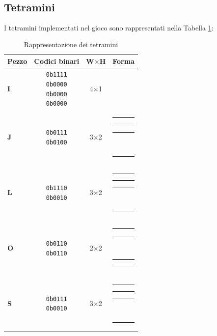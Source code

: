 \documentclass[a4paper, 12pt]{article}
\newcommand{\RedBlock}{\colorbox{red}{\rule{1.2ex}{1.2ex}}}      %
\newcommand{\WhiteBlock}{\fcolorbox{black}{white}{\rule{1.2ex}{1.2ex}}} %
\begin{document}
\subsection{Tetramini}
\label{subsec:tetramini}
I tetramini implementati nel gioco sono rappresentati nella Tabella \ref{tab:tetramini}:

\begin{table}[H]
	\centering
	\caption{Rappresentazione dei tetramini}
	\label{tab:tetramini}
	\begin{tabular}{
		>{\bfseries}l   %
		c               %
		c               %
		l               %
		}
		\toprule
		Pezzo & Codici binari & W\(\times\)H & Forma \\
		\midrule
		I     & \makecell{\texttt{0b1111}                                                 \\\texttt{0b0000}\\\texttt{0b0000}\\\texttt{0b0000}}
		& 4\(\times\)1
		& \makecell{\RedBlock\RedBlock\RedBlock\RedBlock}                           \\
		\addlinespace
		J     & \makecell{\texttt{0b0111}                                                 \\\texttt{0b0100}}
		& 3\(\times\)2
		& \makecell{\WhiteBlock\RedBlock\RedBlock\RedBlock                          \\\WhiteBlock\RedBlock\WhiteBlock\WhiteBlock} \\
		\addlinespace
		L     & \makecell{\texttt{0b1110}                                                 \\\texttt{0b0010}}
		& 3\(\times\)2
		& \makecell{\RedBlock\RedBlock\RedBlock\WhiteBlock                          \\\WhiteBlock\RedBlock\WhiteBlock\WhiteBlock} \\
		\addlinespace
		O     & \makecell{\texttt{0b0110}                                                 \\\texttt{0b0110}}
		& 2\(\times\)2
		& \makecell{\WhiteBlock\RedBlock\RedBlock\WhiteBlock                        \\\WhiteBlock\RedBlock\RedBlock\WhiteBlock} \\
		\addlinespace
		S     & \makecell{\texttt{0b0111}                                                 \\\texttt{0b0010}}
		& 3\(\times\)2
		& \makecell{\WhiteBlock\RedBlock\RedBlock\RedBlock                          \\\WhiteBlock\WhiteBlock\RedBlock\WhiteBlock} \\

\end{tabular}
\end{table}
\end{document}
